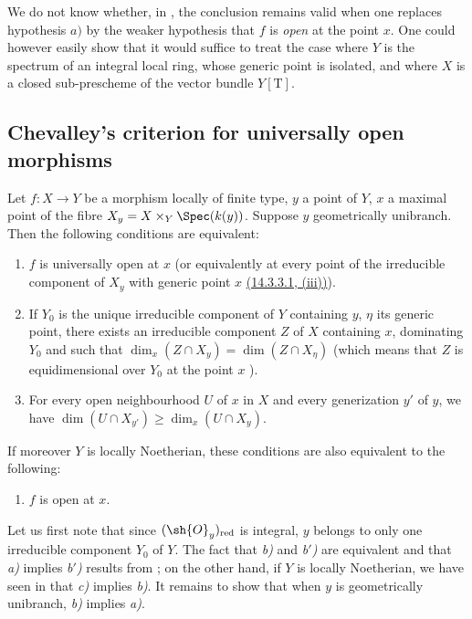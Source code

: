 \begin{remark}[14.3.14]
\label{IV.14.3.14}
We do not know whether, in , the conclusion remains valid when one replaces hypothesis $a)$ by the weaker hypothesis that $f$ is \emph{open} at the point $x$.
One could however easily show that it would suffice to treat the case where $Y$ is the spectrum of an integral local ring, whose generic point is isolated, and where $X$ is a closed sub-prescheme of the vector bundle $Y[\mathrm{T}]$.
\end{remark}
\subsection{Chevalley's criterion for universally open morphisms}
\label{subsection:IV.14.4}

\begin{theorem}[14.4.1]
\label{IV.14.4.1}
Let $f:X\to Y$ be a morphism locally of finite type, $y$ a point of $Y$, $x$ a maximal point of the fibre $X_y=X\times_Y\Spec(k(y))$.
Suppose $y$ geometrically unibranch.
Then the following conditions are equivalent:
\begin{enumerate}[label=\emph{\alph*)}]
  \item $f$ is universally open at $x$ (or equivalently at every point of the irreducible component of $X_y$ with generic point $x$ {\hyperlink{ega4.c04.subsec.14-3-3-1}{(14.3.3.1, (iii))}}).
  \item If $Y_0$ is the unique irreducible component of $Y$ containing $y$, $\eta$ its generic point, there exists an irreducible component $Z$ of $X$ containing $x$, dominating $Y_0$ and such that $\dim_x(Z\cap X_y)=\dim(Z\cap X_\eta)$ (which means that $Z$ is equidimensional over $Y_0$ at the point $x$ ).
  \item[\emph{b$'$)}] For every open neighbourhood $U$ of $x$ in $X$ and every generization $y'$ of $y$, we have $\dim(U\cap X_{y'})\geq\dim_x(U\cap X_y)$.
\end{enumerate}
If moreover $Y$ is locally Noetherian, these conditions are also equivalent to the following:
\begin{enumerate}[label=\emph{\alph*)}]
  \item[\emph{c)}] $f$ is open at $x$.
\end{enumerate}
\end{theorem}

Let us first note that since $(\sh{O}_y)_{\mathrm{red}}$ is integral, $y$ belongs to only one irreducible component $Y_0$ of $Y$.
The fact that \emph{b)} and \emph{b$'$)} are equivalent and that \emph{a)} implies \emph{b$'$)} results from ; on the other hand, if $Y$ is locally Noetherian, we have seen in  that \emph{c)} implies \emph{b)}.
It remains to show that when $y$ is geometrically unibranch, \emph{b)} implies \emph{a)}.

